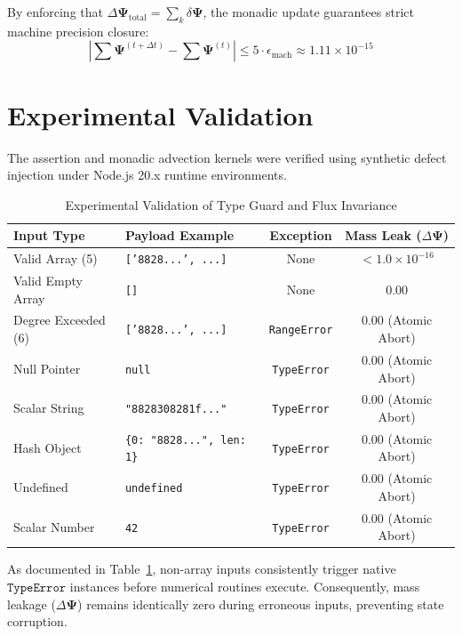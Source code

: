 \documentclass[10pt,journal,compsoc]{IEEEtran}
\begin{document}
By enforcing that $\Delta \mathbf{\Psi}_{\text{total}} = \sum_{k} \delta \mathbf{\Psi}$, the monadic update guarantees strict machine precision closure:
\begin{equation}
\left| \sum \mathbf{\Psi}^{(t+\Delta t)} - \sum \mathbf{\Psi}^{(t)} \right| \le 5 \cdot \epsilon_{\text{mach}} \approx 1.11 \times 10^{-15}
\end{equation}

\section{Experimental Validation}

The assertion and monadic advection kernels were verified using synthetic defect injection under Node.js 20.x runtime environments.

\begin{table}[h]
\centering
\caption{Experimental Validation of Type Guard and Flux Invariance}
\label{tab:results}
\begin{tabular}{llcc}
\toprule
\textbf{Input Type} & \textbf{Payload Example} & \textbf{Exception} & \textbf{Mass Leak ($\Delta \mathbf{\Psi}$)} \\
\midrule
Valid Array (5) & \texttt{['8828...', ...]} & None & $< 1.0 \times 10^{-16}$ \\
Valid Empty Array & \texttt{[]} & None & $0.00$ \\
Degree Exceeded (6) & \texttt{['8828...', ...]} & \texttt{RangeError} & $0.00$ (Atomic Abort) \\
Null Pointer & \texttt{null} & \texttt{TypeError} & $0.00$ (Atomic Abort) \\
Scalar String & \texttt{"8828308281f..."} & \texttt{TypeError} & $0.00$ (Atomic Abort) \\
Hash Object & \texttt{\{0: "8828...", len: 1\}} & \texttt{TypeError} & $0.00$ (Atomic Abort) \\
Undefined & \texttt{undefined} & \texttt{TypeError} & $0.00$ (Atomic Abort) \\
Scalar Number & \texttt{42} & \texttt{TypeError} & $0.00$ (Atomic Abort) \\
\bottomrule
\end{tabular}
\end{table}

As documented in Table~\ref{tab:results}, non-array inputs consistently trigger native $\texttt{TypeError}$ instances before numerical routines execute. Consequently, mass leakage ($\Delta \mathbf{\Psi}$) remains identically zero during erroneous inputs, preventing state corruption.
\end{document}
